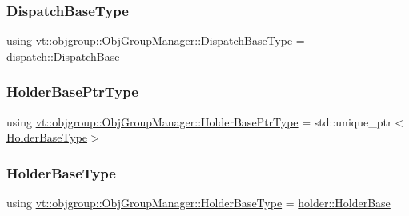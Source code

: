 \mbox{\label{structvt_1_1objgroup_1_1_obj_group_manager_ae89a82f6bfca9bbd007791f1cac88f8f}} 
\subsubsection{\texorpdfstring{Dispatch\+Base\+Type}{DispatchBaseType}}
{\footnotesize\ttfamily using \hyperlink{structvt_1_1objgroup_1_1_obj_group_manager_ae89a82f6bfca9bbd007791f1cac88f8f}{vt\+::objgroup\+::\+Obj\+Group\+Manager\+::\+Dispatch\+Base\+Type} =  \hyperlink{structvt_1_1objgroup_1_1dispatch_1_1_dispatch_base}{dispatch\+::\+Dispatch\+Base}}

\mbox{\label{structvt_1_1objgroup_1_1_obj_group_manager_ac1e9bb19d4a5923dd6d595bad28f04c9}} 
\subsubsection{\texorpdfstring{Holder\+Base\+Ptr\+Type}{HolderBasePtrType}}
{\footnotesize\ttfamily using \hyperlink{structvt_1_1objgroup_1_1_obj_group_manager_ac1e9bb19d4a5923dd6d595bad28f04c9}{vt\+::objgroup\+::\+Obj\+Group\+Manager\+::\+Holder\+Base\+Ptr\+Type} =  std\+::unique\+\_\+ptr$<$\hyperlink{structvt_1_1objgroup_1_1_obj_group_manager_a4898fc9cabf44890e5593f8c4ab86230}{Holder\+Base\+Type}$>$}

\mbox{\label{structvt_1_1objgroup_1_1_obj_group_manager_a4898fc9cabf44890e5593f8c4ab86230}} 
\subsubsection{\texorpdfstring{Holder\+Base\+Type}{HolderBaseType}}
{\footnotesize\ttfamily using \hyperlink{structvt_1_1objgroup_1_1_obj_group_manager_a4898fc9cabf44890e5593f8c4ab86230}{vt\+::objgroup\+::\+Obj\+Group\+Manager\+::\+Holder\+Base\+Type} =  \hyperlink{structvt_1_1objgroup_1_1holder_1_1_holder_base}{holder\+::\+Holder\+Base}}

